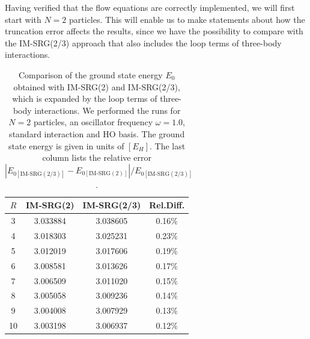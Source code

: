 Having verified that the flow equations are correctly implemented, we will first start with $N=2$ particles. This will enable us to make statements about how the truncation error affects the results, since we have the possibility to compare with the IM-SRG(2/3) approach that also includes the loop terms of three-body interactions.

\begin{table}
\begin{center}
\begin{tabular}{cccc}
\hline\hline
 $R$ & IM-SRG(2)& IM-SRG(2/3)& Rel.Diff. \\
\hline
 3 & 3.033884 &3.038605 & 0.16\%\\
 4 & 3.018303 &3.025231 & 0.23\%\\
5 &  3.012019 &3.017606 & 0.19\%\\
6 &  3.008581 &3.013626 & 0.17\%\\
7 &  3.006509& 3.011020 & 0.15\%\\
8 &  3.005058& 3.009236 & 0.14\%\\
9 &  3.004008& 3.007929 & 0.13\%\\
10 & 3.003198& 3.006937 & 0.12\%  \\
\hline
\end{tabular}
\caption{Comparison of the ground state energy $E_0$ obtained with IM-SRG(2) and \mbox{IM-SRG(2/3)}, which is expanded by the loop terms of three-body interactions. We performed the runs for $N=2$ particles, an oscillator frequency $\omega=1.0$, standard interaction and  HO basis. The ground state energy is given in units of $\left[ E_H \right]$. The last column lists the relative error $\left|E_{0[\text{IM-SRG}(2/3)]}-E_{0[\text{IM-SRG}(2)]}\right|/E_{0[\text{IM-SRG}(2/3)]}$.}
\label{tab:CompIM23}
\end{center}
\end{table}

